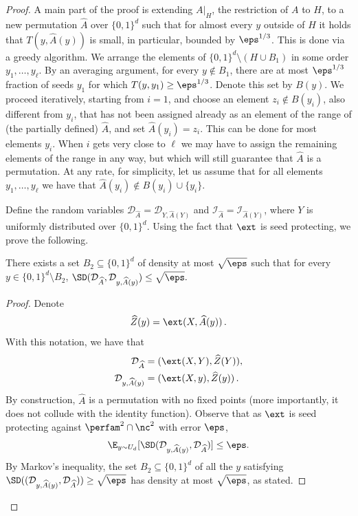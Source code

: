 \documentclass{toc}
\begin{document}
\begin{proof}
                A main part of the proof is extending $A|_H$, the restriction of $A$ to $H$, to a new permutation $\widehat{A}$ over $\{0,1\}^d$ such that for almost every $y$ outside of $H$ it holds that $T(y,\widehat{A}(y))$ is small, in particular, bounded by $\eps^{1/3}$. This is done via a greedy algorithm. We arrange the elements of $\{0,1\}^d \setminus (H \cup B_1)$ in some order $y_1,\ldots,y_\ell$. By an averaging argument, for every $y \not\in B_1$, there are at most $\eps^{1/3}$ fraction of seeds $y_1$ for which $T(y,y_1) \ge \eps^{1/3}$. Denote this set by $B(y)$. We proceed iteratively, starting from $i = 1$, and choose an element $z_i \not\in B(y_i)$, also different from $y_i$, that has not been assigned already as %
an element of the range %
of (the partially defined) $\widehat{A}$, 
and set $\widehat{A}(y_i) = z_i$. This can be done for most
%
elements $y_i$.  %
%
%
When $i$ gets very close to $\ell$ we may have to assign the remaining 
%
elements of the range %
in any way, but which will still
%
 guarantee that $\widehat{A}$ is a permutation. At any rate, for simplicity, let us assume that for all elements $y_1,\ldots,y_\ell$ we have that $\widehat{A}(y_i) \not\in B(y_i) \cup \{y_i\}$.
		

Define the random variables $\mathcal{D}_{\widehat{A}} = \mathcal{D}_{Y,\widehat{A}(Y)}$ and 
$\mathcal{I}_{\widehat{A}} = \mathcal{I}_{\widehat{A}(Y)}$,
	where $Y$ is uniformly distributed over $\{0,1\}^d$. Using the fact that $\ext$ is seed protecting, we prove the following.
	
	\begin{claim}\label{claim:d is concentrated i}
		There exists a set $B_2 \subseteq \{0,1\}^d$ of density at most $\sqrt{\eps}$ such that for every $y \in \{0,1\}^d \setminus B_2$,
		$
		\SD(\mathcal{D}_{\widehat{A}}, \mathcal{D}_{y,\widehat{A}(y)}) \le \sqrt{\eps}.
		$
	\end{claim}
	
	\begin{proof}
		Denote 
\[
		\widehat{Z}(y) =\ext(X,\widehat{A}(y))\,.
\]
		With this notation, we have that
		\begin{align*}
		\mathcal{D}_{\widehat{A}} &= ( \ext(X,Y), \widehat{Z}(Y) ),\\
		\mathcal{D}_{y,\widehat{A}(y)} &= ( \ext(X,y), \widehat{Z}(y) )\,.
		\end{align*}
			By construction, $\widehat{A}$ is a permutation with no fixed points (more importantly, it does not collude with the identity function). Observe that as $\ext$ is seed protecting against $\perfam^2 \cap \nc^2$ with error $\eps$, 
		\[
		\E_{y\sim U_d}[\SD(\mathcal{D}_{y,\widehat{A}(y)}, \mathcal{D}_{\widehat{A}})] \leq \eps.
		\]
By Markov's inequality, the set $B_2 \subseteq \{0,1\}^d$ of %
all the $y$  %
satisfying
$
		\SD((\mathcal{D}_{y,\widehat{A}(y)}, \mathcal{D}_{\widehat{A}})) \geq \sqrt{\eps}
		$
		has density at most $\sqrt{\eps}$, as stated.
		

\end{proof}
\end{proof}
\end{document}
